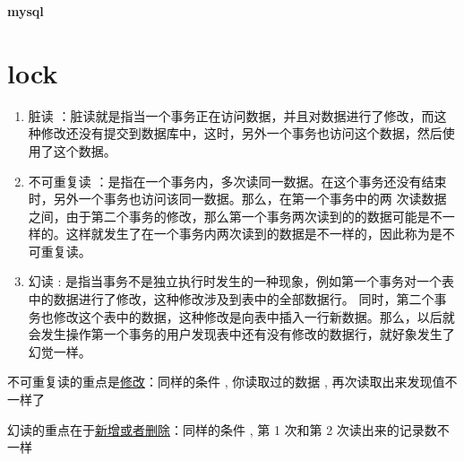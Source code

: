 \begin{center}
     \Large{\textbf{mysql}} \\
\end{center}

\section{lock}

\begin{enumerate}
    \item { 脏读 ：脏读就是指当一个事务正在访问数据，并且对数据进行了修改，而这种修改还没有提交到数据库中，这时，另外一个事务也访问这个数据，然后使用了这个数据。 }
    \item { 不可重复读 ：是指在一个事务内，多次读同一数据。在这个事务还没有结束时，另外一个事务也访问该同一数据。那么，在第一个事务中的两 次读数据之间，由于第二个事务的修改，那么第一个事务两次读到的的数据可能是不一样的。这样就发生了在一个事务内两次读到的数据是不一样的，因此称为是不 可重复读。}
    \item { 幻读 : 是指当事务不是独立执行时发生的一种现象，例如第一个事务对一个表中的数据进行了修改，这种修改涉及到表中的全部数据行。 同时，第二个事务也修改这个表中的数据，这种修改是向表中插入一行新数据。那么，以后就会发生操作第一个事务的用户发现表中还有没有修改的数据行，就好象发生了幻觉一样。}
\end{enumerate}

不可重复读的重点是\underline{修改}：同样的条件 ,   你读取过的数据 ,   再次读取出来发现值不一样了

幻读的重点在于\underline{新增或者删除}：同样的条件 ,   第 1 次和第 2 次读出来的记录数不一样
